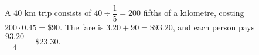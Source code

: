 A $40$ km trip consists of $40\div\dfrac{1}{5}=200$ fifths of a kilometre, costing $200\cdot0.45=\$90$. The fare is $3.20+90=\$93.20$, and each person pays $\dfrac{93.20}{4}=\boxed{\$23.30}$.
